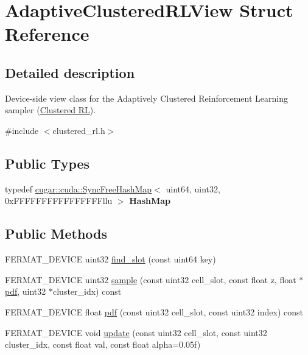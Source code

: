 \hypertarget{struct_adaptive_clustered_r_l_view}{}\section{Adaptive\+Clustered\+R\+L\+View Struct Reference}
\label{struct_adaptive_clustered_r_l_view}


\subsection{Detailed description}
Device-\/side view class for the Adaptively Clustered Reinforcement Learning sampler (\hyperlink{group___clustered_r_l_module}{Clustered RL}). 

{\ttfamily \#include $<$clustered\+\_\+rl.\+h$>$}

\subsection*{Public Types}
\begin{DoxyCompactItemize}
\item 
\mbox{\label{struct_adaptive_clustered_r_l_view_a1ca90f76eb5bb129eae12267b52a04c7}} 
typedef \hyperlink{structcugar_1_1cuda_1_1_sync_free_hash_map}{cugar\+::cuda\+::\+Sync\+Free\+Hash\+Map}$<$ uint64, uint32, 0x\+F\+F\+F\+F\+F\+F\+F\+F\+F\+F\+F\+F\+F\+F\+F\+Fllu $>$ {\bfseries Hash\+Map}
\end{DoxyCompactItemize}
\subsection*{Public Methods}
\begin{DoxyCompactItemize}
\item 
F\+E\+R\+M\+A\+T\+\_\+\+D\+E\+V\+I\+CE uint32 \hyperlink{struct_adaptive_clustered_r_l_view_af716fb3b65bc1c3ffb25bd7055feb41b}{find\+\_\+slot} (const uint64 key)
\item 
F\+E\+R\+M\+A\+T\+\_\+\+D\+E\+V\+I\+CE uint32 \hyperlink{struct_adaptive_clustered_r_l_view_adc3c05a08f010f0e682b332dceb6f15f}{sample} (const uint32 cell\+\_\+slot, const float z, float $\ast$\hyperlink{struct_adaptive_clustered_r_l_view_a85017597296cbd1b1db695f5affb4ff8}{pdf}, uint32 $\ast$cluster\+\_\+idx) const
\item 
F\+E\+R\+M\+A\+T\+\_\+\+D\+E\+V\+I\+CE float \hyperlink{struct_adaptive_clustered_r_l_view_a85017597296cbd1b1db695f5affb4ff8}{pdf} (const uint32 cell\+\_\+slot, const uint32 index) const
\item 
F\+E\+R\+M\+A\+T\+\_\+\+D\+E\+V\+I\+CE void \hyperlink{struct_adaptive_clustered_r_l_view_a2d22060ad6f9a30598f0ad657bf73171}{update} (const uint32 cell\+\_\+slot, const uint32 cluster\+\_\+idx, const float val, const float alpha=0.\+05f)
\end{DoxyCompactItemize}
